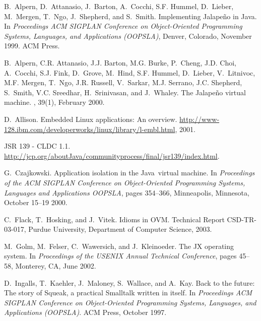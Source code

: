 \documentclass{sigplanconf}
\begin{document}
\newcommand{\etalchar}[1]{$^{#1}$}
\begin{thebibliography}{GFWK02}

\bibitem[AAB{\etalchar{+}}99]{Alpe99}
B.~Alpern, D.~Attanasio, J.~Barton, A.~Cocchi, S.F. Hummel, D.~Lieber,
  M.~Mergen, T.~Ngo, J.~Shepherd, and S.~Smith.
\newblock Implementing {J}alape\~{n}o in {J}ava.
\newblock In {\em Proceedings {ACM SIGPLAN} Conference on Object-Oriented
  Programming Systems, Languages, and Applications (OOPSLA)}, Denver, Colorado,
  November 1999. {ACM} Press.

\bibitem[AAB{\etalchar{+}}00]{Alpe00}
B.~Alpern, C.R. Attanasio, J.J. Barton, M.G. Burke, P.~Cheng, J.D. Choi,
  A.~Cocchi, S.J. Fink, D.~Grove, M.~Hind, S.F. Hummel, D.~Lieber, V.~Litnivoc,
  M.F. Mergen, T.~Ngo, J.R. Russell, V.~Sarkar, M.J. Serrano, J.C. Shepherd,
  S.~Smith, V.C. Sreedhar, H.~Srinivasan, and J.~Whaley.
\newblock The {J}alape\~{n}o virtual machine.
, 39(1), February 2000.

D.~Allison.
\newblock Embedded {L}inux applications: An overview.
\newblock
  \url{http://www-128.ibm.com/developerworks/linux/library/l-embl.html}, 2001.

{JSR} 139 - {CLDC} 1.1.
\newblock
  \url{http://jcp.org/aboutJava/communityprocess/final/jsr139/index.html}.

G.~Czajkowski.
\newblock Application isolation in the {J}ava\texttrademark\ virtual machine.
\newblock In {\em Proceedings of the {ACM SIGPLAN} Conference on
  Object-Oriented Programming Systems, Languages and Applications {OOPSLA}},
  pages 354--366, Minneapolis, Minnesota, October 15--19 2000.

C.~Flack, T.~Hosking, and J.~Vitek.
\newblock Idioms in {OVM}.
\newblock Technical Report CSD-TR-03-017, Purdue University, Department of
  Computer Science, 2003.

M.~Golm, M.~Felser, C.~Wawersich, and J.~Kleinoeder.
\newblock The {JX} operating system.
\newblock In {\em Proceedings of the {USENIX} Annual Technical Conference},
  pages 45--58, Monterey, CA, June 2002.

\bibitem[IKM{\etalchar{+}}97]{Inga97}
D.~Ingalls, T.~Kaehler, J.~Maloney, S.~Wallace, and A.~Kay.
\newblock Back to the future: The story of {S}queak, a practical {S}malltalk
  written in itself.
\newblock In {\em Proceedings {ACM SIGPLAN} Conference on Object-Oriented
  Programming Systems, Languages, and Applications (OOPSLA)}. {ACM} Press,
  October 1997.


\end{thebibliography}
\end{document}
